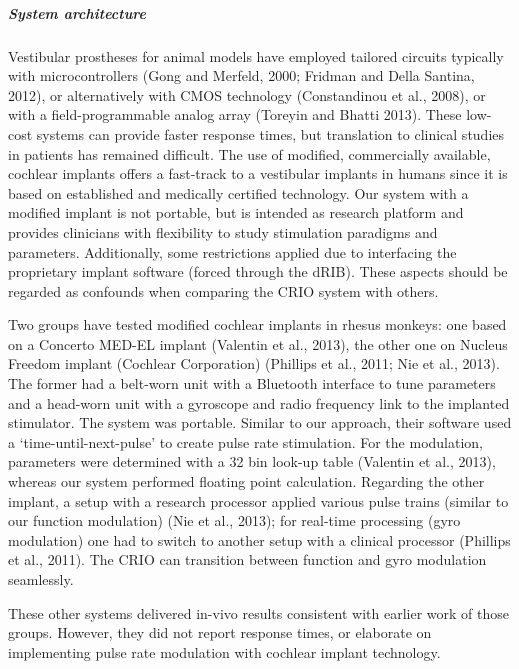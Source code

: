 \subparagraph{System architecture}
Vestibular prostheses for animal models have employed tailored circuits typically with microcontrollers (Gong and Merfeld, 2000; Fridman and Della Santina, 2012), or alternatively with CMOS technology (Constandinou et al., 2008), or with a field-programmable analog array (Toreyin and Bhatti 2013). These low-cost systems can provide faster response times, but translation to clinical studies in patients has remained difficult. The use of modified, commercially available, cochlear implants offers a fast-track to a vestibular implants in humans since it is based on established and medically certified technology. Our system with a modified implant is not portable, but is intended as research platform and provides clinicians with flexibility to study stimulation paradigms and parameters. Additionally, some restrictions applied due to interfacing the proprietary implant software (forced through the dRIB). These aspects should be regarded as confounds when comparing the CRIO system with others.

	Two groups have tested modified cochlear implants in rhesus monkeys: one based on a Concerto MED-EL implant (Valentin et al., 2013), the other one on Nucleus Freedom implant (Cochlear Corporation) (Phillips et al., 2011; Nie et al., 2013). The former had a belt-worn unit with a Bluetooth interface to tune parameters and a head-worn unit with a gyroscope and radio frequency link to the implanted stimulator. The system was portable. Similar to our approach, their software used a ‘time-until-next-pulse’ to create pulse rate stimulation. For the modulation, parameters were determined with a 32 bin look-up table (Valentin et al., 2013), whereas our system performed floating point calculation. Regarding the other implant, a setup with a research processor applied various pulse trains (similar to our function modulation) (Nie et al., 2013); for real-time processing (gyro modulation) one had to switch to another setup with a clinical processor (Phillips et al., 2011). The CRIO can transition between function and gyro modulation seamlessly.
	
	These other systems delivered in-vivo results consistent with earlier work of those groups. However, they did not report response times, or elaborate on implementing pulse rate modulation with cochlear implant technology.
	
